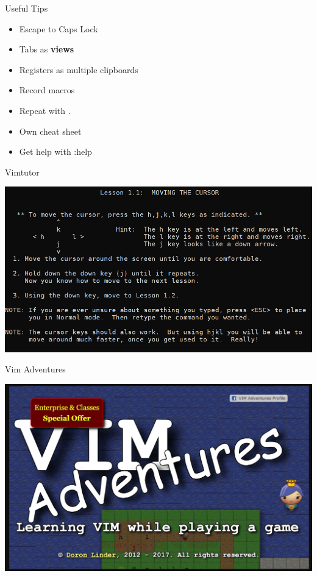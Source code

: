 \documentclass{beamer}
\begin{document}
\begin{frame}{Useful Tips}
    \begin{itemize}
        \item Escape to Caps Lock
        \item Tabs as \textbf{views}
        \item Registers as multiple clipboards
        \item Record macros
        \item Repeat with .
        \item Own cheat sheet
        \item Get help with :help
    \end{itemize}
\end{frame}

\begin{frame}{Vimtutor}
    \begin{center}
        \includegraphics[width=1\textwidth]{images/vimtutor.png}
    \end{center}
\end{frame}

\begin{frame}{Vim Adventures}
    \begin{center}
        \includegraphics[width=1\textwidth]{images/vim-adventure.png}
    \end{center}
\end{frame}
\end{document}
